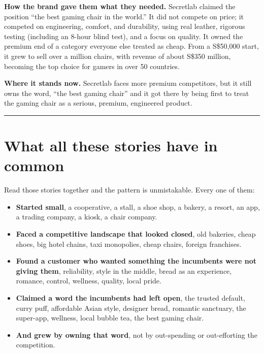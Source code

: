 \documentclass[10pt,twoside,openany]{memoir}
\begin{document}
\textbf{How the brand gave them what they needed.} Secretlab claimed the
position ``the best gaming chair in the world.'' It did not compete on
price; it competed on engineering, comfort, and durability, using real
leather, rigorous testing (including an 8-hour blind test), and a focus
on quality. It owned the premium end of a category everyone else treated
as cheap. From a S\$50,000 start, it grew to sell over a million chairs,
with revenue of about S\$350 million, becoming the top choice for gamers
in over 50 countries.

\textbf{Where it stands now.} Secretlab faces more premium competitors,
but it still owns the word, ``the best gaming chair'' and it got there
by being first to treat the gaming chair as a serious, premium,
engineered product.

\begin{center}\rule{0.5\linewidth}{0.5pt}\end{center}

\FloatBarrier
\chapter{What all these stories have in
common}\label{what-all-these-stories-have-in-common}

Read those stories together and the pattern is unmistakable. Every one
of them:

\begin{itemize}
\tightlist
\item
  \textbf{Started small}, a cooperative, a stall, a shoe shop, a bakery,
  a resort, an app, a trading company, a kiosk, a chair company.
\item
  \textbf{Faced a competitive landscape that looked closed}, old
  bakeries, cheap shoes, big hotel chains, taxi monopolies, cheap
  chairs, foreign franchises.
\item
  \textbf{Found a customer who wanted something the incumbents were not
  giving them}, reliability, style in the middle, bread as an
  experience, romance, control, wellness, quality, local pride.
\item
  \textbf{Claimed a word the incumbents had left open}, the trusted
  default, curry puff, affordable Asian style, designer bread, romantic
  sanctuary, the super-app, wellness, local bubble tea, the best gaming
  chair.
\item
  \textbf{And grew by owning that word}, not by out-spending or
  out-efforting the competition.
\end{itemize}
\end{document}

